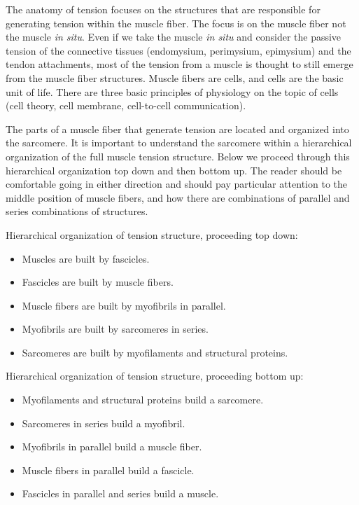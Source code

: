 The anatomy of tension focuses on the structures that are responsible for generating tension within the muscle fiber. The focus is on the muscle fiber not the muscle \textit{in situ}. Even if we take the muscle \textit{in situ} and consider the passive tension of the connective tissues (endomysium, perimysium, epimysium) and the tendon attachments, most of the tension from a muscle is thought to still emerge from the muscle fiber structures. Muscle fibers are cells, and cells are the basic unit of life. There are three basic principles of physiology on the topic of cells (cell theory, cell membrane, cell-to-cell communication). 

The parts of a muscle fiber that generate tension are located and organized into the sarcomere. It is important to understand the sarcomere within a hierarchical organization of the full muscle tension structure. Below we proceed through this hierarchical organization top down and then bottom up. The reader should be comfortable going in either direction and should pay particular attention to the middle position of muscle fibers, and how there are combinations of parallel and series combinations of structures. 

\vspace{0.2cm}
\begin{flushleft}
    Hierarchical organization of tension structure, proceeding top down: 
\end{flushleft}
\begin{itemize}
\item Muscles are built by fascicles. 
\item Fascicles are built by muscle fibers. 
\item Muscle fibers are built by myofibrils in parallel. 
\item Myofibrils are built by sarcomeres in series. 
\item Sarcomeres are built by myofilaments and structural proteins.
\end{itemize}

\vspace{0.2cm}
\begin{flushleft}
    Hierarchical organization of tension structure, proceeding bottom up: 
\end{flushleft}
\begin{itemize}
\item Myofilaments and structural proteins build a sarcomere. 
\item Sarcomeres in series build a myofibril. 
\item Myofibrils in parallel build a muscle fiber. 
\item Muscle fibers in parallel build a fascicle. 
\item Fascicles in parallel and series build a muscle.
\end{itemize}

